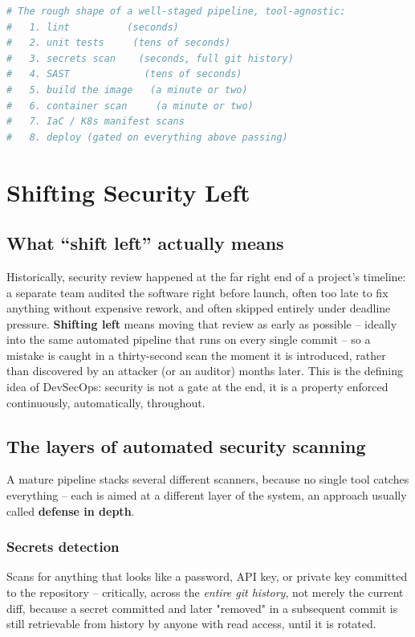 \documentclass[11pt,twoside,openright]{book}
\begin{document}
\begin{lstlisting}[language=bash]
# The rough shape of a well-staged pipeline, tool-agnostic:
#   1. lint          (seconds)
#   2. unit tests     (tens of seconds)
#   3. secrets scan    (seconds, full git history)
#   4. SAST             (tens of seconds)
#   5. build the image   (a minute or two)
#   6. container scan     (a minute or two)
#   7. IaC / K8s manifest scans
#   8. deploy (gated on everything above passing)
\end{lstlisting}

\chapter{Shifting Security Left}
\label{ch:shiftleft}

\section{What ``shift left'' actually means}

Historically, security review happened at the far right end of a project's timeline: a
separate team audited the software right before launch, often too late to fix anything
without expensive rework, and often skipped entirely under deadline pressure.
\textbf{Shifting left} means moving that review as early as possible -- ideally into the
same automated pipeline that runs on every single commit -- so a mistake is caught in a
thirty-second scan the moment it is introduced, rather than discovered by an attacker (or
an auditor) months later. This is the defining idea of DevSecOps: security is not a gate
at the end, it is a property enforced continuously, automatically, throughout.

\section{The layers of automated security scanning}

A mature pipeline stacks several different scanners, because no single tool catches
everything -- each is aimed at a different layer of the system, an approach usually called
\textbf{defense in depth}.

\subsection{Secrets detection}

Scans for anything that looks like a password, API key, or private key committed to the
repository -- critically, across the \emph{entire git history}, not merely the current
diff, because a secret committed and later "removed" in a subsequent commit is still
retrievable from history by anyone with read access, until it is rotated.
\end{document}
